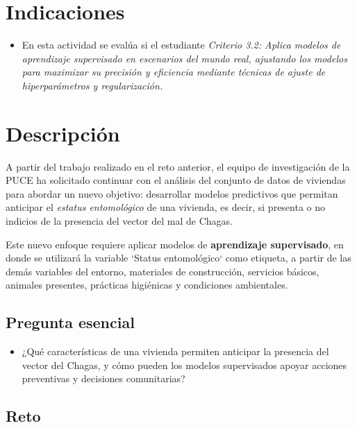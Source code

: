 \documentclass[a4,11pt]{aleph-notas}
\begin{document}
\encabezado

\section{Indicaciones}
\begin{itemize}[leftmargin=*]
\item 
    En esta actividad se evalúa si el estudiante \textit{Criterio 3.2: Aplica modelos de aprendizaje supervisado en escenarios del mundo real, ajustando los modelos para maximizar su precisión y eficiencia mediante técnicas de ajuste de hiperparámetros y regularización.}
\end{itemize}


\section{Descripción}

A partir del trabajo realizado en el reto anterior, el equipo de investigación de la PUCE ha solicitado continuar con el análisis del conjunto de datos de viviendas para abordar un nuevo objetivo: desarrollar modelos predictivos que permitan anticipar el \textit{estatus entomológico} de una vivienda, es decir, si presenta o no indicios de la presencia del vector del mal de Chagas.

Este nuevo enfoque requiere aplicar modelos de \textbf{aprendizaje supervisado}, en donde se utilizará la variable `Status entomológico` como etiqueta, a partir de las demás variables del entorno, materiales de construcción, servicios básicos, animales presentes, prácticas higiénicas y condiciones ambientales.

\subsection*{Pregunta esencial}
\begin{itemize}[leftmargin=*]
    \item ¿Qué características de una vivienda permiten anticipar la presencia del vector del Chagas, y cómo pueden los modelos supervisados apoyar acciones preventivas y decisiones comunitarias?
\end{itemize}

\subsection*{Reto}
\end{document}

